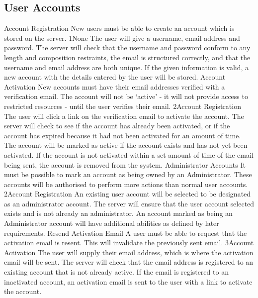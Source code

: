 	\subsection{User Accounts} %
		\funcreq %
			{Account Registration}
			{New users must be able to create an account which is stored on 
			the server.}
			{1}{None}
			{The user will give a username, email address and password.}
			{The server will check that the username and password conform 
			to any length and composition restraints, the email is structured 
			correctly, and that the username and email address are both unique.
			}
			{If the given information is valid, a new account with the details 
			entered by the user will be stored.}
		\funcreq %
			{Account Activation}
			{New accounts must have their email addresses verified with a 
			verification email. The account will not be `active' - it will not 
			provide access to restricted resources - until the user verifies 
			their email.}
			{2}{Account Registration}
			{The user will click a link on the verification email to activate 
			the account.}
			{The server will check to see if the account has already been 
			activated, or if the account has expired because it had not been 
			activated for an amount of time.}
			{The account will be marked as active if the account exists and 
			has not yet been activated. If the account is not activated 
			within a set amount of time of the email being sent, the account 
			is removed from the system.}
		\funcreq %
			{Administrator Accounts}
			{It must be possible to mark an account as being owned by an 
			Administrator. These accounts will be authorised to perform more 
			actions than normal user accounts.}
			{2}{Account Registration}
			{An existing user account will be selected to be designated as 
			an administrator account.}
			{The server will ensure that the user account selected exists
			and is not already an administrator.}
			{An account marked as being an Administrator account will have 
			additional abilities as defined by later requirements.}
		\funcreq %
			{Resend Activation Email}
			{A user must be able to request that the activation email is
			resent. This will invalidate the previously sent email.}
			{3}{Account Activation}
			{The user will supply their email address, which is where the 
			activation email will be sent.}
			{The server will check that the email address is registered to an 
			existing account that is not already active.}
			{If the email is registered to an inactivated account, an 
			activation email is sent to the user with a link to activate the 
			account.}
